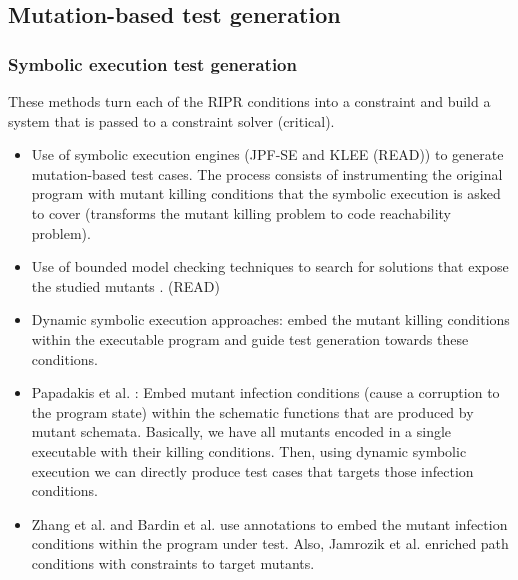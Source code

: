 
\subsection{Mutation-based test generation}
\label{sub:test_generation}

\subsubsection{Symbolic execution test generation} %

These methods turn each of the RIPR conditions into a constraint and build a system that is passed to a constraint solver (critical).

\begin{itemize}
	\item Use of symbolic execution engines (JPF-SE \cite{anand2007jpf} and KLEE \cite{holling2016nequivack} (READ)) to generate mutation-based test cases. 
	The process consists of instrumenting the original program with mutant killing conditions that the symbolic execution is asked to cover (transforms the mutant killing problem to code reachability problem). 
	\item Use of bounded model checking techniques to search for solutions that expose the studied mutants \cite{riener2011test}. (READ)

	\item Dynamic symbolic execution approaches: embed the mutant killing conditions within the executable program and guide test generation towards these conditions.

	\item Papadakis et al. \cite{papadakis2011automatically, papadakis2010towards}:
	Embed mutant infection conditions (cause a corruption to the program state) within the schematic functions that are produced by mutant schemata. Basically, we have all mutants encoded in a single executable with their killing conditions. Then, using dynamic symbolic execution we can directly produce test cases that targets those infection conditions.

	\item Zhang et al. \cite{zhang2010test} and Bardin et al. \cite{papadakis2011automatically,papadakis2010towards} use annotations to embed the mutant infection conditions within the program under test. Also, Jamrozik et al. \cite{jamrozik2013generating} enriched path conditions with constraints to target mutants.


\end{itemize}
